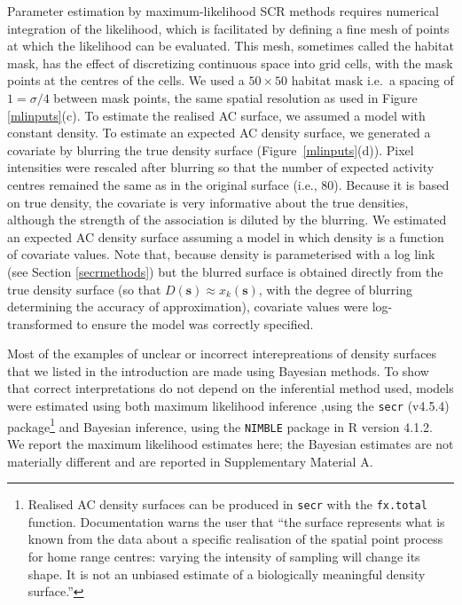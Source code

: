 \documentclass[useAMS,usenatbib,referee]{biom}
\begin{document}
Parameter estimation by maximum-likelihood SCR methods requires numerical integration of the likelihood, which is facilitated by defining a fine mesh of points at which the likelihood can be evaluated. This mesh, sometimes called the habitat mask, has the effect of discretizing continuous space into grid cells, with the mask points at the centres of the cells. We used a $50\times 50$ habitat mask i.e.\, a spacing of $1=\sigma/4$ between mask points, the same spatial resolution as used in Figure \ref{mlinputs}(c). To estimate the realised AC surface, we assumed a model with constant density. To estimate an expected AC density surface, we generated a covariate by blurring the true density surface (Figure~\ref{mlinputs}(d)). Pixel intensities were rescaled after blurring so that the number of expected activity centres remained the same as in the original surface (i.e., 80). Because it is based on true density, the covariate is very informative about the true densities, although the strength of the association is diluted by the blurring. We estimated an expected AC density surface assuming a model in which density is a function of covariate values. Note that, because density is parameterised with a log link (see Section \ref{secrmethods}) but the blurred surface is obtained directly from the true density surface (so that $D(\mathbf{s})\approx x_k(\mathbf{s})$, with the degree of blurring determining the accuracy of approximation), covariate values were log-transformed to ensure the model was correctly specified.

Most of the examples of unclear or incorrect interepreations of density surfaces that we listed in the introduction are made using Bayesian methods. To show that correct interpretations do not depend on the inferential method used, models were estimated using both maximum likelihood inference ,using the \texttt{secr} (v4.5.4) package\footnote{Realised AC density surfaces can be produced in \texttt{secr} with the \texttt{fx.total} function. Documentation warns the user that ``the surface represents what is known from the data about a specific realisation of the spatial point process for home range centres: varying the intensity of sampling will change its shape. It is not an unbiased estimate of a biologically meaningful density surface.''} \citep{secr:21} and Bayesian inference, using the \texttt{NIMBLE} package \citep{deValpine:17, Turek:21} in R version 4.1.2. We report the maximum likelihood estimates here; the Bayesian estimates are not materially different and are reported in Supplementary Material A.
\end{document}
